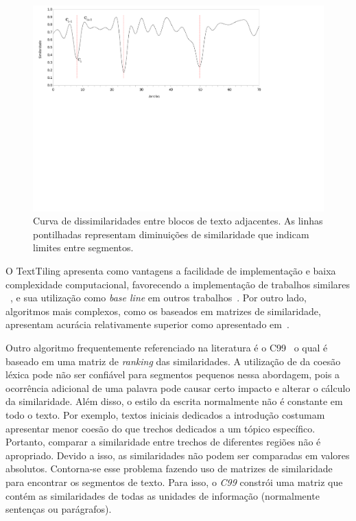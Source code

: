    
\begin{figure}[h!]
\center
	\includegraphics[trim={ 10 320 180 0 },clip,page=1,width=\textwidth]{conteudo/capitulos/figs/curva-similaridade.pdf}

	\caption{Curva de dissimilaridades entre blocos de texto adjacentes. As linhas pontilhadas representam diminuições de similaridade que indicam limites entre segmentos.}
	\label{fig:curvasimilaridade}
\end{figure}



O TextTiling apresenta como vantagens a facilidade de implementação e baixa complexidade computacional, favorecendo a implementação de trabalhos similares 
~\cite{Naili2016,Bokaei2015a,CHAIBI2014,Kern2009,Galley2003}, 
e sua utilização como \textit{base line} em outros trabalhos~\cite{Cardoso2017,Dias2007}. Por outro lado, algoritmos mais complexos, como os baseados em matrizes de similaridade, apresentam acurácia relativamente superior como apresentado em~\cite{Choi2000a, Kern2009, Misra2009a}.



Outro algoritmo frequentemente referenciado na literatura é o C99~\cite{Choi2000a} o qual é baseado em uma matriz de \textit{ranking} das similaridades. A utilização de da coesão léxica pode não ser confiável para segmentos pequenos nessa abordagem, pois a ocorrência adicional de uma palavra pode causar certo impacto e alterar o cálculo da similaridade. Além disso, o estilo da escrita normalmente não é constante em todo o texto. Por exemplo, textos iniciais dedicados a introdução costumam apresentar menor coesão do que trechos dedicados a um tópico específico. Portanto, comparar a similaridade entre trechos de diferentes regiões não é apropriado. Devido a isso, as similaridades não podem ser comparadas em valores absolutos. Contorna-se esse problema fazendo uso de matrizes de similaridade para encontrar os segmentos de texto. Para isso, o \textit{C99} constrói uma matriz que contém as similaridades de todas as unidades de informação (normalmente sentenças ou parágrafos). 

